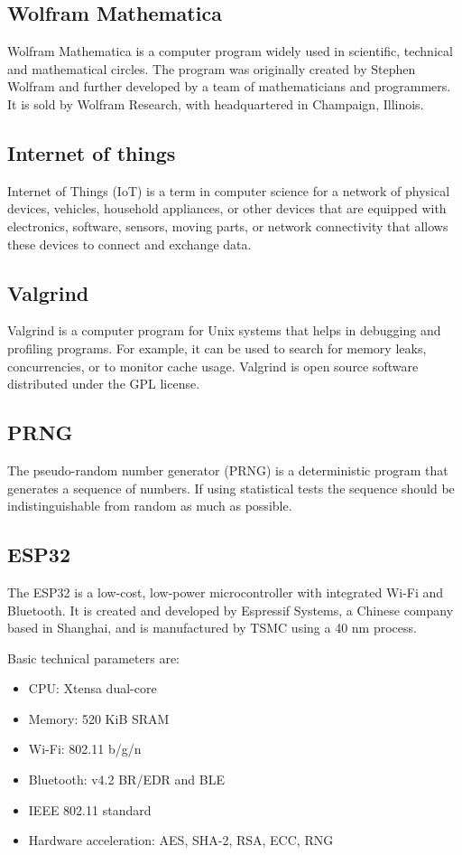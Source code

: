 \documentclass[thesis=M,english]{FITthesis}[2019/12/23]
\begin{document}
\subsection{Wolfram Mathematica}
Wolfram Mathematica is a computer program widely used in scientific, technical and mathematical circles. The program was originally created by Stephen Wolfram and further developed by a team of mathematicians and programmers. It is sold by Wolfram Research, with headquartered in Champaign, Illinois.

\subsection{Internet of things}
Internet of Things (IoT) is a term in computer science for a network of physical devices, vehicles, household appliances, or other devices that are equipped with electronics, software, sensors, moving parts, or network connectivity that allows these devices to connect and exchange data.

\subsection{Valgrind}
Valgrind is a computer program for Unix systems that helps in debugging and profiling programs. For example, it can be used to search for memory leaks, concurrencies, or to monitor cache usage. Valgrind is open source software distributed under the GPL license.

\subsection{PRNG}
The pseudo-random number generator (PRNG) is a deterministic program that generates a sequence of numbers. If using statistical tests the sequence should be indistinguishable from random as much as possible.

\subsection{ESP32}
The ESP32 is a low-cost, low-power microcontroller with integrated Wi-Fi and Bluetooth. It is created and developed by Espressif Systems, a Chinese company based in Shanghai, and is manufactured by TSMC using a 40 nm process.

\bigskip
\noindent
Basic technical parameters are:
\begin{itemize}
\item	CPU: Xtensa dual-core
\item	Memory: 520 KiB SRAM
\item	Wi-Fi: 802.11 b/g/n
\item	Bluetooth: v4.2 BR/EDR and BLE
\item	IEEE 802.11 standard
\item	Hardware acceleration: AES, SHA-2, RSA, ECC, RNG
\end{itemize}
\end{document}
